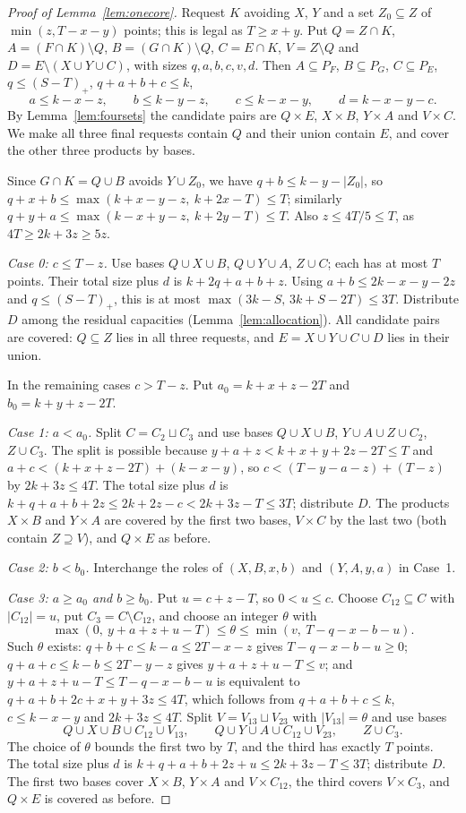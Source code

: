 \documentclass[11pt]{article}
\numberwithin{equation}{section}
\theoremstyle{definition}
\theoremstyle{remark}
\begin{document}
\begin{proof}[Proof of Lemma~\ref{lem:onecore}]
Request $K$ avoiding $X$, $Y$ and a set $Z_0\subseteq Z$ of
$\min(z,T-x-y)$ points; this is legal as $T\ge x+y$. Put
$Q=Z\cap K$, $A=(F\cap K)\setminus Q$, $B=(G\cap K)\setminus Q$,
$C=E\cap K$, $V=Z\setminus Q$ and $D=E\setminus(X\cup Y\cup C)$, with
sizes $q,a,b,c,v,d$. Then $A\subseteq P_F$, $B\subseteq P_G$,
$C\subseteq P_E$, $q\le(S-T)_+$, $q+a+b+c\le k$,
\[
 a\le k-x-z,\qquad b\le k-y-z,\qquad c\le k-x-y,\qquad d=k-x-y-c .
\]
By Lemma~\ref{lem:foursets} the candidate pairs are $Q\times E$,
$X\times B$, $Y\times A$ and $V\times C$. We make all three final
requests contain $Q$ and their union contain $E$, and cover the other
three products by bases.

Since $G\cap K=Q\cup B$ avoids $Y\cup Z_0$, we have $q+b\le k-y-|Z_0|$, so
$q+x+b\le\max(k+x-y-z,\ k+2x-T)\le T$; similarly
$q+y+a\le\max(k-x+y-z,\ k+2y-T)\le T$. Also $z\le4T/5\le T$, as
$4T\ge2k+3z\ge5z$.

\emph{Case 0: $c\le T-z$.} Use bases $Q\cup X\cup B$, $Q\cup Y\cup A$,
$Z\cup C$; each has at most $T$ points. Their total size plus $d$ is
$k+2q+a+b+z$. Using $a+b\le2k-x-y-2z$ and $q\le(S-T)_+$, this is at most
$\max(3k-S,\,3k+S-2T)\le3T$. Distribute $D$ among the residual
capacities (Lemma~\ref{lem:allocation}). All candidate pairs are
covered: $Q\subseteq Z$ lies in all three requests, and
$E=X\cup Y\cup C\cup D$ lies in their union.

In the remaining cases $c>T-z$. Put $a_0=k+x+z-2T$ and $b_0=k+y+z-2T$.

\emph{Case 1: $a<a_0$.} Split $C=C_2\sqcup C_3$ and use bases
$Q\cup X\cup B$, $Y\cup A\cup Z\cup C_2$, $Z\cup C_3$. The split is
possible because $y+a+z<k+x+y+2z-2T\le T$ and
$a+c<(k+x+z-2T)+(k-x-y)$, so $c<(T-y-a-z)+(T-z)$ by $2k+3z\le4T$. The
total size plus $d$ is $k+q+a+b+2z\le2k+2z-c<2k+3z-T\le3T$; distribute
$D$. The products $X\times B$ and $Y\times A$ are covered by the first
two bases, $V\times C$ by the last two (both contain $Z\supseteq V$),
and $Q\times E$ as before.

\emph{Case 2: $b<b_0$.} Interchange the roles of $(X,B,x,b)$ and
$(Y,A,y,a)$ in Case~1.

\emph{Case 3: $a\ge a_0$ and $b\ge b_0$.} Put $u=c+z-T$, so $0<u\le c$.
Choose $C_{12}\subseteq C$ with $|C_{12}|=u$, put $C_3=C\setminus C_{12}$,
and choose an integer $\theta$ with
\[
 \max(0,\ y+a+z+u-T)\le\theta\le\min(v,\ T-q-x-b-u).
\]
Such $\theta$ exists: $q+b+c\le k-a\le2T-x-z$ gives $T-q-x-b-u\ge0$;
$q+a+c\le k-b\le2T-y-z$ gives $y+a+z+u-T\le v$; and
$y+a+z+u-T\le T-q-x-b-u$ is equivalent to $q+a+b+2c+x+y+3z\le4T$, which
follows from $q+a+b+c\le k$, $c\le k-x-y$ and $2k+3z\le4T$. Split
$V=V_{13}\sqcup V_{23}$ with $|V_{13}|=\theta$ and use bases
\[
 Q\cup X\cup B\cup C_{12}\cup V_{13},\qquad
 Q\cup Y\cup A\cup C_{12}\cup V_{23},\qquad Z\cup C_3 .
\]
The choice of $\theta$ bounds the first two by $T$, and the third has
exactly $T$ points. The total size plus $d$ is
$k+q+a+b+2z+u\le2k+3z-T\le3T$; distribute $D$. The first two bases cover
$X\times B$, $Y\times A$ and $V\times C_{12}$, the third covers
$V\times C_3$, and $Q\times E$ is covered as before.
\end{proof}
\end{document}
